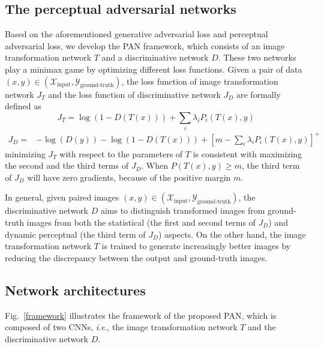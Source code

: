 \documentclass{article}
\newcommand{\ie}{\textit{i}.\textit{e}.}
\begin{document}
\subsection{The perceptual adversarial networks}

Based on the aforementioned generative adversarial loss and perceptual adversarial loss, we develop the PAN framework, which consists of an image transformation network $T$ and a discriminative network $D$. These two networks play a minimax game by optimizing different loss functions. Given a pair of data $(x,y)\in(\mathcal{X}_\text{input},\mathcal{Y}_\text{ground-truth})$, the loss function of image transformation network $J_T$ and the loss function of discriminative network $J_D$ are formally defined as
\begin{equation}
J_T =  \log(1-D(T(x))) + \sum_{i} \lambda_i P_i(T(x),y)
\end{equation} 
\begin{equation}
\begin{aligned}
J_D = &  -\log(D(y)) - \log(1-D(T(x))) + [m - \sum_{i} \lambda_i P_i(T(x),y)]^+
\end{aligned}
\end{equation}
minimizing $J_T$ with respect to the parameters of $T$ is consistent with maximizing the second and the third terms of $J_D$. When $P(T(x),y) \geq m$, the third term of $J_D$ will have zero gradients, because of the positive margin $m$.

In general, given paired images $(x, y) \in (\mathcal{X}_\text{input}, \mathcal{Y}_\text{ground-truth})$, the discriminative network $D$ aims to distinguish transformed images from ground-truth images from both the statistical (the first and second terms of $J_D$) and dynamic perceptual (the third term of $J_D$) aspects. On the other hand, the image transformation network $T$ is trained to generate increasingly better images by reducing the discrepancy between the output and ground-truth images. 

\subsection{Network architectures}

Fig.~\ref{framework} illustrates the framework of the proposed PAN, which is composed of two CNNs, \ie, the image transformation network $T$ and the discriminative network $D$. 
\end{document}
